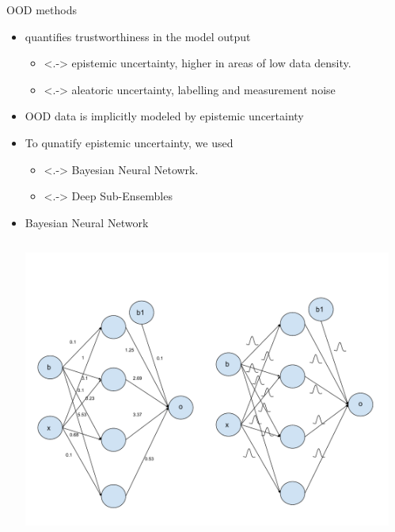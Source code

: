\documentclass[10pt, aspectratio=169]{beamer}
\begin{document}
\begin{frame}[allowframebreaks]{OOD methods}
\begin{itemize}
            \begin{itemize}
                \item quantifies trustworthiness in the model output
                \begin{itemize}
                        \item<.-> epistemic uncertainty, higher in areas of low data density.
                        \item<.-> aleatoric uncertainty, labelling and measurement noise
                \end{itemize}
                \item OOD data is implicitly modeled by epistemic uncertainty
                \item To qunatify epistemic uncertainty, we used
                \begin{itemize}
                    \item<.-> Bayesian Neural Netowrk.
                    \item<.-> Deep Sub-Ensembles
                \end{itemize}
            \end{itemize}
            \pagebreak
        \begin{itemize}
            \item Bayesian Neural Network
            \begin{columns}
                   \centering
                   \includegraphics[scale=0.275]{images/BNN.pdf}
                    \begin{itemize}

\end{itemize}
\end{columns}
\end{itemize}
\end{itemize}
\end{frame}
\end{document}
